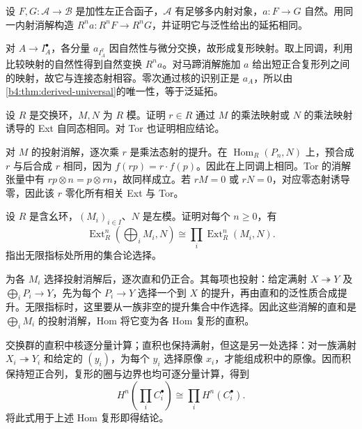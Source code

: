 \begin{exercise}\label{b4:ex:08-derived-natural-transformation}
	设 \(F,G:\mathcal A\to\mathcal B\) 是加性左正合函子，\(\mathcal A\) 有足够多内射对象，\(a:F\to G\) 自然。用同一内射消解构造 \(R^na:R^nF\to R^nG\)，并证明它与泛性给出的延拓相同。
\end{exercise}
\begin{solution}
	对 \(A\to I_A^\bullet\)，各分量 \(a_{I_A^q}\) 因自然性与微分交换，故形成复形映射。取上同调，利用比较映射的自然性得到自然变换 \(R^na\)。对马蹄消解施加 \(a\) 给出短正合复形列之间的映射，故它与连接态射相容。零次通过核的识别正是 \(a_A\)，所以由\cref{b4:thm:derived-universal}的唯一性，等于泛延拓。
\end{solution}

\begin{exercise}\label{b4:ex:08-central-actions}
	设 \(R\) 是交换环，\(M,N\) 为 \(R\) 模。证明 \(r\in R\) 通过 \(M\) 的乘法映射或 \(N\) 的乘法映射诱导的 Ext 自同态相同。对 Tor 也证明相应结论。
\end{exercise}
\begin{solution}
	对 \(M\) 的投射消解，逐次乘 \(r\) 是乘法态射的提升。在 \(\operatorname{Hom}_R(P_n,N)\) 上，预合成 \(r\) 与后合成 \(r\) 相同，因为 \(f(rp)=r\cdot f(p)\)。因此在上同调上相同。Tor 的消解张量中有 \(rp\otimes n=p\otimes rn\)，故同样成立。若 \(rM=0\) 或 \(rN=0\)，对应零态射诱导零，因此该 \(r\) 零化所有相关 Ext 与 Tor。
\end{solution}

\begin{exercise}\label{b4:ex:08-ext-sum-product}
	设 \(R\) 是含幺环，\((M_i)_{i\in I}\)、\(N\) 是左模。证明对每个 \(n\ge0\)，有
	\[
		\operatorname{Ext}_R^n(\bigoplus_iM_i,N)\cong\prod_i\operatorname{Ext}_R^n(M_i,N).
	\]
	指出无限指标处所用的集合论选择。
\end{exercise}
\begin{solution}
	为各 \(M_i\) 选择投射消解后，逐次直和仍正合。其每项也投射：给定满射 \(X\twoheadrightarrow Y\) 及 \(\bigoplus_iP_i\to Y\)，先为每个 \(P_i\to Y\) 选择一个到 \(X\) 的提升，再由直和的泛性质合成提升。无限指标时，这里要从一族非空的提升集合中作选择。因此这些消解的直和是 \(\bigoplus_iM_i\) 的投射消解，Hom 将它变为各 Hom 复形的直积。

	交换群的直积中核逐分量计算；直积也保持满射，但这是另一处选择：对一族满射 \(X_i\twoheadrightarrow Y_i\) 和给定的 \((y_i)\)，为每个 \(y_i\) 选择原像 \(x_i\)，才能组成积中的原像。因而积保持短正合列，复形的圈与边界也均可逐分量计算，得到
	\[
		H^n\!\left(\prod_i C_i^\bullet\right) \cong\prod_i H^n(C_i^\bullet).
	\]
	将此式用于上述 Hom 复形即得结论。
\end{solution}

